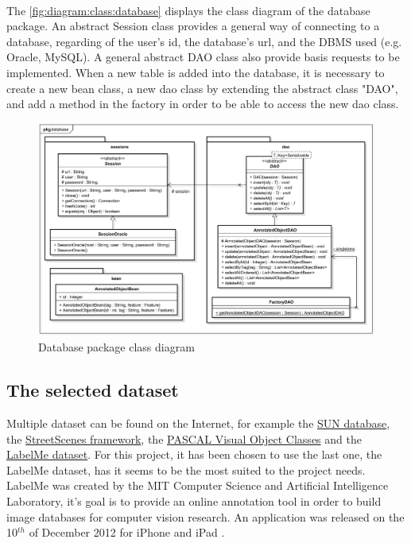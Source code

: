 ~~


The \vref{fig:diagram:class:database} displays the class diagram of the database package. An abstract Session class provides a general way of connecting to a database, regarding of the user's id, the database's url, and the \gls{DBMS} used (e.g. Oracle, MySQL). A general abstract DAO class also provide basis requests to be implemented. When a new table is added into the database, it is necessary to create a new bean class, a new dao class by extending the abstract class "DAO", and add a method in the factory in order to be able to access the new dao class.


\begin{figure}[h]
	\centering 
	\includegraphics[width=1\textwidth]{images/diagrams/class_diagram_database}
	\caption{Database package class diagram}
	\label{fig:diagram:class:database}
\end{figure}


\subsection{The selected dataset}

Multiple dataset can be found on the Internet, for example the \href{http://groups.csail.mit.edu/vision/SUN/}{SUN database}, the \href{http://cbcl.mit.edu/software-datasets/streetscenes/}{StreetScenes framework}, the \href{http://host.robots.ox.ac.uk/pascal/VOC/voc2007/index.html}{PASCAL Visual Object Classes} and the \href{http://labelme2.csail.mit.edu/Release3.0/browserTools/php/dataset.php}{LabelMe dataset}. For this project, it has been chosen to use the last one, the LabelMe dataset, has it seems to be the most suited to the project needs. LabelMe was created by the MIT Computer Science and Artificial Intelligence Laboratory, it's goal is to provide an online annotation tool in order to build image databases for computer vision research. An application was released on the 10$^{th}$ of December 2012 for iPhone and iPad \cite{bib:labelme}.

